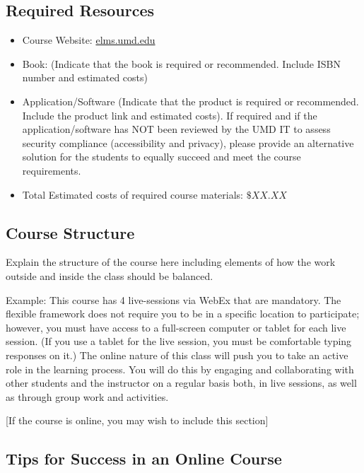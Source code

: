 \documentclass[11pt]{article}
\def\tightlist{}
\begin{document}
\hypertarget{required-resources}{%
\subsection{Required Resources}\label{required-resources}}

\begin{itemize}
\tightlist
\item
  Course Website: \url{elms.umd.edu}
\item
  Book: (Indicate that the book is required or recommended. Include ISBN
  number and estimated costs)
\item
  Application/Software (Indicate that the product is required or
  recommended. Include the product link and estimated costs). If
  required and if the application/software has NOT been reviewed by the
  UMD IT to assess security compliance (accessibility and privacy),
  please provide an alternative solution for the students to equally
  succeed and meet the course requirements.
\item
  Total Estimated costs of required course materials: \(\$XX.XX\)
\end{itemize}

\hypertarget{course-structure}{%
\subsection{Course Structure}\label{course-structure}}

Explain the structure of the course here including elements of how the
work outside and inside the class should be balanced.

Example: This course has 4 live-sessions via WebEx that are mandatory.
The flexible framework does not require you to be in a specific location
to participate; however, you must have access to a full-screen computer
or tablet for each live session. (If you use a tablet for the live
session, you must be comfortable typing responses on it.) The online
nature of this class will push you to take an active role in the
learning process. You will do this by engaging and collaborating with
other students and the instructor on a regular basis both, in live
sessions, as well as through group work and activities.

{[}If the course is online, you may wish to include this section{]}

\hypertarget{tips-for-success-in-an-online-course}{%
\subsection{Tips for Success in an Online
Course}\label{tips-for-success-in-an-online-course}}
\end{document}
